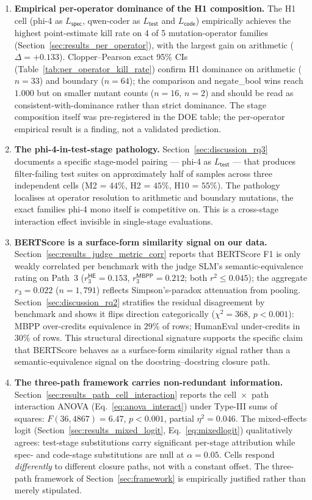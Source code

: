 \begin{enumerate}
  \item \textbf{Empirical per-operator dominance of the H1 composition.} The H1 cell (phi-4 as $L_{\textsf{spec}}$, qwen-coder as $L_{\textsf{test}}$ and $L_{\textsf{code}}$) empirically achieves the highest point-estimate kill rate on 4 of 5 mutation-operator families (Section~\ref{sec:results_per_operator}), with the largest gain on arithmetic ($\Delta = +0.133$). Clopper--Pearson exact 95\% CIs (Table~\ref{tab:per_operator_kill_rate}) confirm H1 dominance on arithmetic ($n = 33$) and boundary ($n = 64$); the comparison and negate\_bool wins reach $1.000$ but on smaller mutant counts ($n = 16$, $n = 2$) and should be read as consistent-with-dominance rather than strict dominance. The stage composition itself was pre-registered in the DOE table; the per-operator empirical result is a finding, not a validated prediction.

  \item \textbf{The phi-4-in-test-stage pathology.} Section~\ref{sec:discussion_rq3} documents a specific stage-model pairing --- phi-4 as $L_{\textsf{test}}$ --- that produces filter-failing test suites on approximately half of samples across three independent cells (M2 = $44\%$, H2 = $45\%$, H10 = $55\%$). The pathology localises at operator resolution to arithmetic and boundary mutations, the exact families phi-4 mono itself is competitive on. This is a cross-stage interaction effect invisible in single-stage evaluations.

  \item \textbf{BERTScore is a surface-form similarity signal on our data.} Section~\ref{sec:results_judge_metric_corr} reports that BERTScore F1 is only weakly correlated per benchmark with the judge SLM's semantic-equivalence rating on Path~3 ($r_3^{\textsf{HE}} = 0.153$, $r_3^{\textsf{MBPP}} = 0.212$; both $r^2 \leq 0.045$); the aggregate $r_3 = 0.022$ ($n = 1{,}791$) reflects Simpson's-paradox attenuation from pooling. Section~\ref{sec:discussion_rq2} stratifies the residual disagreement by benchmark and shows it flips direction categorically ($\chi^2 = 368$, $p < 0.001$): MBPP over-credits equivalence in $29\%$ of rows; HumanEval under-credits in $30\%$ of rows. This structural directional signature supports the specific claim that BERTScore behaves as a surface-form similarity signal rather than a semantic-equivalence signal on the docstring--docstring closure path.

  \item \textbf{The three-path framework carries non-redundant information.} Section~\ref{sec:results_path_cell_interaction} reports the cell~$\times$~path interaction ANOVA (Eq.~\ref{eq:anova_interact}) under Type-III sums of squares: $F(36, 4867) = 6.47$, $p < 0.001$, partial $\eta^2 = 0.046$. The mixed-effects logit (Section~\ref{sec:results_mixed_logit}, Eq.~\ref{eq:mixedlogit}) qualitatively agrees: test-stage substitutions carry significant per-stage attribution while spec- and code-stage substitutions are null at $\alpha = 0.05$. Cells respond \emph{differently} to different closure paths, not with a constant offset. The three-path framework of Section~\ref{sec:framework} is empirically justified rather than merely stipulated.


\end{enumerate}
